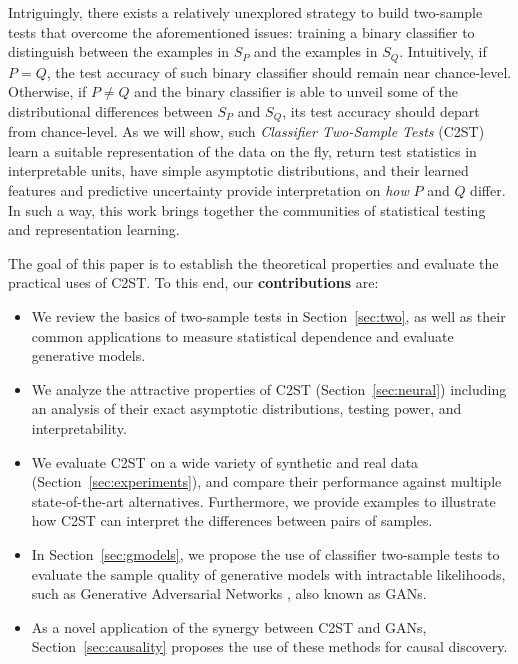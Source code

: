 \documentclass[a4paper]{article}
\begin{document}
  Intriguingly, there exists a relatively unexplored strategy to build
  two-sample tests that overcome the aforementioned issues: training a binary
  classifier to distinguish between the examples in $S_P$ and the examples in
  $S_Q$.  Intuitively, if $P=Q$, the test accuracy of such binary classifier
  should remain near chance-level. Otherwise, if $P\neq Q$ and the binary
  classifier is able to unveil some of the distributional differences between
  $S_P$ and $S_Q$, its test accuracy should depart from chance-level.  As we
  will show, such \emph{Classifier Two-Sample Tests} (C2ST) learn a suitable
  representation of the data on the fly, return test statistics in interpretable 
  units, have simple asymptotic distributions, and their learned features and
  predictive uncertainty provide interpretation on \emph{how} $P$ and $Q$ differ.
  In such a way, this work brings together the communities of statistical testing
  and representation learning.
  
  The goal of this paper is to establish the theoretical properties and
  evaluate the practical uses of C2ST.  To this end, our \textbf{contributions}
  are:
  \begin{itemize}
    \item We review the basics of two-sample tests in Section~\ref{sec:two}, as
    well as their common applications to measure statistical dependence and
    evaluate generative models.
    \item We analyze the attractive properties of C2ST (Section~\ref{sec:neural})
    including an analysis of their exact asymptotic distributions, testing
    power, and interpretability.
    \item We evaluate C2ST on a wide variety of synthetic and real data
    (Section~\ref{sec:experiments}), and compare their performance against
    multiple state-of-the-art alternatives. Furthermore, we provide 
    examples to illustrate how C2ST can interpret the differences between pairs
    of samples.
    \item In Section~\ref{sec:gmodels}, we propose the use of classifier
    two-sample tests to evaluate the sample quality of generative models with
    intractable likelihoods, such as Generative Adversarial Networks
    \citep{goodfellow2014generative}, also known as GANs.
    \item As a novel application of the synergy between C2ST 
    and GANs, Section~\ref{sec:causality}
    proposes the use of these methods for causal discovery.
  \end{itemize}
\end{document}
